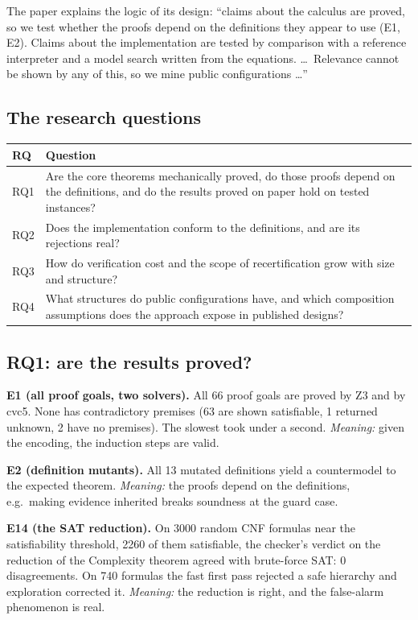 The paper explains the logic of its design: ``claims about the calculus are proved, so we test whether the proofs depend on the definitions they appear to use (E1, E2). Claims about the implementation are tested by comparison with a reference interpreter and a model search written from the equations. \dots\ Relevance cannot be shown by any of this, so we mine public configurations \dots''

\subsection{The research questions}

\begin{center}
\renewcommand{\arraystretch}{1.25}
\begin{tabularx}{\textwidth}{@{}lX@{}}
\toprule
\textbf{RQ} & \textbf{Question}\\
\midrule
RQ1 & Are the core theorems mechanically proved, do those proofs depend on the definitions, and do the results proved on paper hold on tested instances?\\
RQ2 & Does the implementation conform to the definitions, and are its rejections real?\\
RQ3 & How do verification cost and the scope of recertification grow with size and structure?\\
RQ4 & What structures do public configurations have, and which composition assumptions does the approach expose in published designs?\\
\bottomrule
\end{tabularx}
\end{center}

\subsection{RQ1: are the results proved?}

\textbf{E1 (all proof goals, two solvers).} All 66 proof goals are proved by Z3 and by cvc5. None has contradictory premises (63 are shown satisfiable, 1 returned unknown, 2 have no premises). The slowest took under a second. \emph{Meaning:} given the encoding, the induction steps are valid.

\textbf{E2 (definition mutants).} All 13 mutated definitions yield a countermodel to the expected theorem. \emph{Meaning:} the proofs depend on the definitions, e.g.\ making evidence inherited breaks soundness at the guard case.

\textbf{E14 (the SAT reduction).} On 3000 random CNF formulas near the satisfiability threshold, 2260 of them satisfiable, the checker's verdict on the reduction of the Complexity theorem agreed with brute-force SAT: 0 disagreements. On 740 formulas the fast first pass rejected a safe hierarchy and exploration corrected it. \emph{Meaning:} the reduction is right, and the false-alarm phenomenon is real.


